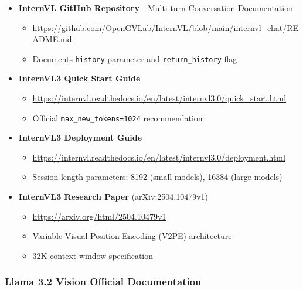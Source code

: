 \documentclass[11pt,a4paper]{article}
\begin{document}
\begin{itemize}[leftmargin=*]
    \item \textbf{InternVL GitHub Repository} - Multi-turn Conversation Documentation
    \begin{itemize}
        \item \url{https://github.com/OpenGVLab/InternVL/blob/main/internvl_chat/README.md}
        \item Documents \texttt{history} parameter and \texttt{return\_history} flag
    \end{itemize}

    \item \textbf{InternVL3 Quick Start Guide}
    \begin{itemize}
        \item \url{https://internvl.readthedocs.io/en/latest/internvl3.0/quick_start.html}
        \item Official \texttt{max\_new\_tokens=1024} recommendation
    \end{itemize}

    \item \textbf{InternVL3 Deployment Guide}
    \begin{itemize}
        \item \url{https://internvl.readthedocs.io/en/latest/internvl3.0/deployment.html}
        \item Session length parameters: 8192 (small models), 16384 (large models)
    \end{itemize}

    \item \textbf{InternVL3 Research Paper} (arXiv:2504.10479v1)
    \begin{itemize}
        \item \url{https://arxiv.org/html/2504.10479v1}
        \item Variable Visual Position Encoding (V2PE) architecture
        \item 32K context window specification
    \end{itemize}
\end{itemize}

\subsubsection{Llama 3.2 Vision Official Documentation}
\end{document}
